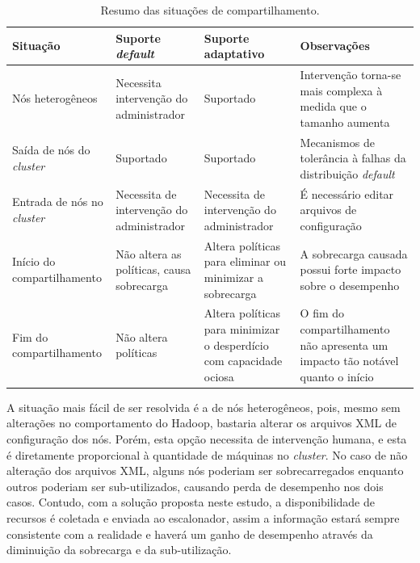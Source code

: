 \begin{table}[h!]
	\centering
	\begin{tabular}{m{}|m{}|m{}|m{}}
		\textbf{Situação} & \textbf{Suporte \textit{default}} & \textbf{Suporte adaptativo} & \textbf{Observações}\\
		\hline
		Nós heterogêneos & Necessita intervenção do administrador & Suportado & Intervenção torna-se mais complexa à medida que o tamanho aumenta\\
		\hline
		Saída de nós do \textit{cluster} & Suportado & Suportado & Mecanismos de tolerância à falhas da distribuição \textit{default}\\
		\hline
		Entrada de nós no \textit{cluster} & Necessita de intervenção do administrador & Necessita de intervenção do administrador & É necessário editar arquivos de configuração\\
		\hline
		Início do compartilhamento & Não altera as políticas, causa sobrecarga & Altera políticas para eliminar ou minimizar a sobrecarga & A sobrecarga causada possui forte impacto sobre o desempenho\\
		\hline
		Fim do compartilhamento & Não altera políticas & Altera políticas para minimizar o desperdício com capacidade ociosa & O fim do compartilhamento não apresenta um impacto tão notável quanto o início\\
	\end{tabular}
	\caption{Resumo das situações de compartilhamento.}
	\label{tab:situações}
\end{table}



A situação mais fácil de ser resolvida é a de nós heterogêneos, pois, mesmo sem alterações no comportamento do Hadoop, bastaria alterar os arquivos XML de configuração dos nós. Porém, esta opção necessita de intervenção humana, e esta é diretamente proporcional à quantidade de máquinas no \textit{cluster}. No caso de não alteração dos arquivos XML, alguns nós poderiam ser sobrecarregados enquanto outros poderiam ser sub-utilizados, causando perda de desempenho nos dois casos. Contudo, com a solução proposta neste estudo, a disponibilidade de recursos é coletada e enviada ao escalonador,  assim a informação estará sempre consistente com a realidade e haverá um ganho de desempenho através da diminuição da sobrecarga e da sub-utilização.

